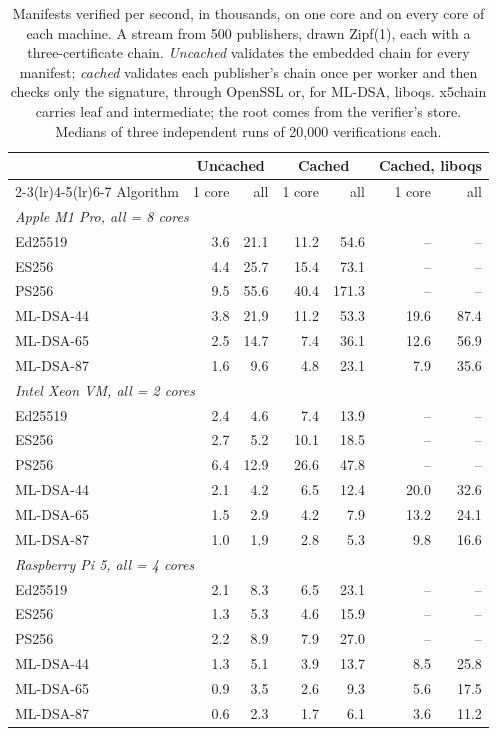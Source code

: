 \begin{table}[t]
\caption{Manifests verified per second, in thousands, on one core and on every core of each machine. A stream from 500 publishers, drawn Zipf(1), each with a three-certificate chain. \emph{Uncached} validates the embedded chain for every manifest; \emph{cached} validates each publisher's chain once per worker and then checks only the signature, through OpenSSL or, for ML-DSA, liboqs. x5chain carries leaf and intermediate; the root comes from the verifier's store. Medians of three independent runs of 20,000 verifications each.}
\label{tab:scale}
\begin{tabular}{lrrrrrr}
\toprule
 & \multicolumn{2}{c}{Uncached} & \multicolumn{2}{c}{Cached} & \multicolumn{2}{c}{Cached, liboqs}\\
\cmidrule(lr){2-3}\cmidrule(lr){4-5}\cmidrule(lr){6-7}
Algorithm & 1 core & all & 1 core & all & 1 core & all\\
\midrule
\multicolumn{7}{l}{\emph{Apple M1 Pro, all = 8 cores}}\\
Ed25519 & 3.6 & 21.1 & 11.2 & 54.6 & -- & --\\
ES256 & 4.4 & 25.7 & 15.4 & 73.1 & -- & --\\
PS256 & 9.5 & 55.6 & 40.4 & 171.3 & -- & --\\
ML-DSA-44 & 3.8 & 21.9 & 11.2 & 53.3 & 19.6 & 87.4\\
ML-DSA-65 & 2.5 & 14.7 & 7.4 & 36.1 & 12.6 & 56.9\\
ML-DSA-87 & 1.6 & 9.6 & 4.8 & 23.1 & 7.9 & 35.6\\
\midrule
\multicolumn{7}{l}{\emph{Intel Xeon VM, all = 2 cores}}\\
Ed25519 & 2.4 & 4.6 & 7.4 & 13.9 & -- & --\\
ES256 & 2.7 & 5.2 & 10.1 & 18.5 & -- & --\\
PS256 & 6.4 & 12.9 & 26.6 & 47.8 & -- & --\\
ML-DSA-44 & 2.1 & 4.2 & 6.5 & 12.4 & 20.0 & 32.6\\
ML-DSA-65 & 1.5 & 2.9 & 4.2 & 7.9 & 13.2 & 24.1\\
ML-DSA-87 & 1.0 & 1.9 & 2.8 & 5.3 & 9.8 & 16.6\\
\midrule
\multicolumn{7}{l}{\emph{Raspberry Pi 5, all = 4 cores}}\\
Ed25519 & 2.1 & 8.3 & 6.5 & 23.1 & -- & --\\
ES256 & 1.3 & 5.3 & 4.6 & 15.9 & -- & --\\
PS256 & 2.2 & 8.9 & 7.9 & 27.0 & -- & --\\
ML-DSA-44 & 1.3 & 5.1 & 3.9 & 13.7 & 8.5 & 25.8\\
ML-DSA-65 & 0.9 & 3.5 & 2.6 & 9.3 & 5.6 & 17.5\\
ML-DSA-87 & 0.6 & 2.3 & 1.7 & 6.1 & 3.6 & 11.2\\
\bottomrule
\end{tabular}
\end{table}
